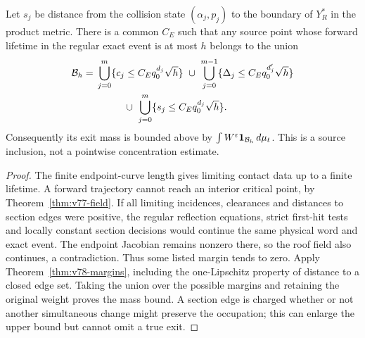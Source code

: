 \begin{proposition}
\label{prop:v78-exit-localization}
Let $s_j$ be distance from the collision state $(\alpha_j,p_j)$
to the boundary of $Y_R^*$ in the product metric. There is a common
$C_E$ such that any source point whose forward lifetime in the
regular exact event is at most $h$ belongs to the union
\begin{align}
 \mathcal B_h={}&\bigcup_{j=0}^m
     \{c_j\le C_Eq_0^{d_j}\sqrt h\}
 \ \cup\ \bigcup_{j=0}^{m-1}
     \{\Delta_j\le C_Eq_0^{d'_j}\sqrt h\}\notag\\
 &\hspace{10mm}\cup\ \bigcup_{j=0}^m
     \{s_j\le C_Eq_0^{d_j}\sqrt h\}.\label{eq:v78-exit-layer}
\end{align}
Consequently its exit mass is bounded above by
$\int W^\varepsilon\mathbf1_{\mathcal B_h}\,d\mu_t$.
This is a source inclusion, not a pointwise concentration estimate.
\end{proposition}
\begin{proof}
The finite endpoint-curve length gives limiting contact data up to
a finite lifetime. A forward trajectory cannot reach an interior
critical point, by Theorem~\ref{thm:v77-field}. If all limiting
incidences, clearances and distances to section edges were positive,
the regular reflection equations, strict first-hit tests and locally
constant section decisions would continue the same physical word
and exact event. The endpoint Jacobian remains nonzero there, so
the roof field also continues, a contradiction. Thus some listed
margin tends to zero. Apply Theorem~\ref{thm:v78-margins}, including
the one-Lipschitz property of distance to a closed edge set. Taking
the union over the possible margins and retaining the original
weight proves the mass bound. A section edge is charged whether
or not another simultaneous change might preserve the occupation;
this can enlarge the upper bound but cannot omit a true exit.
\end{proof}
